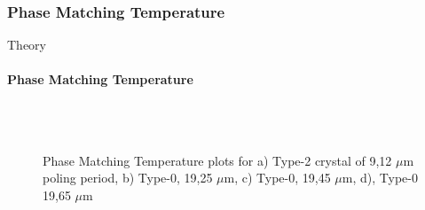 \documentclass[serif,8pt]{beamer}
\begin{document}
\subsubsection{Phase Matching Temperature}
\begin{frame}{Theory}
	\framesubtitle{Phase Matching Temperature}
	\begin{figure}[!ht]
	  \centering
	  \caption{Phase Matching Temperature plots for a) Type-2 crystal of 9,12 $\mu$m poling period, b) Type-0, 19,25 $\mu$m, c) Type-0, 19,45 $\mu$m, d), Type-0 19,65 $\mu$m}
	  \quad
	  \\
	  \quad
	  \\
	  \label{fig:gratingstheory}
	\end{figure}
\end{frame}
\end{document}
